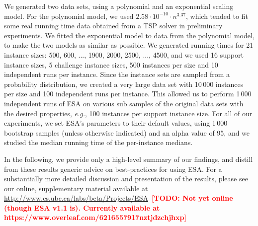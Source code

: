 \documentclass[aic]{iosart2x}
\newcommand{\eg}{\emph{e.g.}}
\newcommand{\todo}[1]{\textcolor{red}{\bf [TODO: #1]}}
\begin{document}
We generated two data sets, using a polynomial and an exponential scaling model. For the polynomial model, we used $2.58\cdot 10^{-10} \cdot n^{3.37}$, which tended to fit some real running time data obtained from a TSP solver in preliminary experiments. 
We fitted the exponential model to data from the polynomial model, to make the two models as similar as possible. 
We generated running times for 21 instance sizes: 500, 600, ..., 1900, 2000, 2500, ..., 4500, and we used 16 support instance sizes, 5 challenge instance sizes, 500 instances per size and 10 independent runs per instance. 
Since the instance sets are sampled from a probability distribution, we created a very large data set with 10\,000 instances per size and 100 independent runs per instance. 
This allowed us to perform 1\,000 independent runs of ESA on various sub samples of the original data sets with the desired properties, \eg{}, 100 instances per support instance size.
For all of our experiments, we set ESA's parameters to their default values, using 1\,000 bootstrap samples (unless otherwise indicated) and an alpha value of 95, and we studied the median running time of the per-instance medians. 

In the following, we provide only a high-level summary of our findings, and distill from these results generic advice on best-practices for using ESA. 
For a substantially more detailed discussion and presentation of the results, please see our online, supplementary material available at \url{http://www.cs.ubc.ca/labs/beta/Projects/ESA}~\todo{Not yet online (though ESA v1.1 is). Currently available at https://www.overleaf.com/6216557917nztjdzchjhxp}

\end{document}

